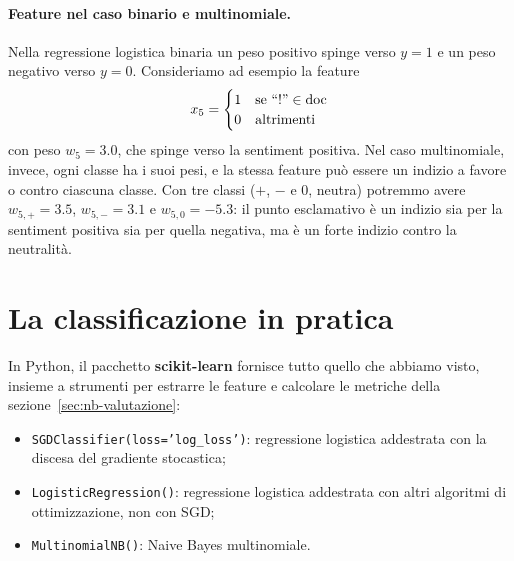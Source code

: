 \paragraph{Feature nel caso binario e multinomiale.} Nella regressione logistica binaria un peso positivo spinge verso $y = 1$ e un peso negativo verso $y = 0$. Consideriamo ad esempio la feature
\[
x_5 = \begin{cases} 1 & \text{se ``!''} \in \text{doc} \\ 0 & \text{altrimenti} \end{cases}
\]
con peso $w_5 = 3.0$, che spinge verso la sentiment positiva. Nel caso multinomiale, invece, ogni classe ha i suoi pesi, e la stessa feature può essere un indizio a favore o contro ciascuna classe. Con tre classi ($+$, $-$ e $0$, neutra) potremmo avere $w_{5,+} = 3.5$, $w_{5,-} = 3.1$ e $w_{5,0} = -5.3$: il punto esclamativo è un indizio sia per la sentiment positiva sia per quella negativa, ma è un forte indizio contro la neutralità.

\section{La classificazione in pratica}
In Python, il pacchetto \textbf{scikit-learn} fornisce tutto quello che abbiamo visto, insieme a strumenti per estrarre le feature e calcolare le metriche della sezione~\ref{sec:nb-valutazione}:
\begin{itemize}
    \item \texttt{SGDClassifier(loss='log\_loss')}: regressione logistica addestrata con la discesa del gradiente stocastica;
    \item \texttt{LogisticRegression()}: regressione logistica addestrata con altri algoritmi di ottimizzazione, non con SGD;
    \item \texttt{MultinomialNB()}: Naive Bayes multinomiale.
\end{itemize}
